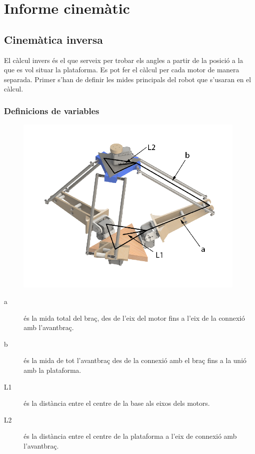 \section{Informe cinemàtic}
\subsection{Cinemàtica inversa}

El càlcul invers és el que serveix per trobar els angles a partir de la posició a la que es vol situar la plataforma. Es pot fer el càlcul per cada motor de manera separada. Primer s'han de definir les mides principals del robot que s'usaran en el càlcul.

\subsubsection{Definicions de variables}
\begin{figure}[h!]
\centering
\includegraphics[width=12cm]{./imgComp/esquema_general}
\end{figure}

\begin{description}
\item[a] és la mida total del braç, des de l'eix del motor fins a l'eix de la connexió amb l'avantbraç.
\item[b] és la mida de tot l'avantbraç des de la connexió amb el braç fins a la unió amb la plataforma.
\item[L1] és la distància entre el centre de la base als eixos dels motors.
\item[L2] és la distància entre el centre de la plataforma a l'eix de connexió amb l'avantbraç.
\end{description}

